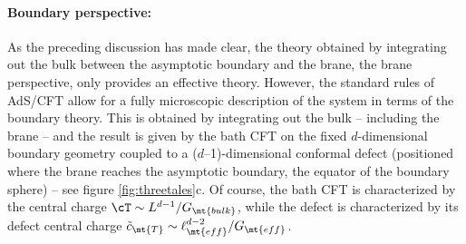 \paragraph{Boundary perspective:} As the preceding discussion has made clear, the theory obtained by integrating out the bulk between the asymptotic boundary and the brane, \ie the brane perspective, only provides an effective theory. However, the standard rules of AdS/CFT allow for a fully microscopic description of the system in terms of the boundary theory. This is obtained by integrating out the bulk -- including the brane -- and the result  is given by the bath CFT on the fixed $d$-dimensional boundary geometry coupled to a ($d$--1)-dimensional conformal defect (positioned where the brane reaches the asymptotic boundary, \ie the equator of the boundary sphere) -- see figure \ref{fig:threetales}c. Of course, the bath CFT is characterized by the central charge $\cT\sim L^{d-1}/G_\mt{bulk}$, while the defect is characterized by its defect central charge $\tilde{c}_\mt{T}\sim \ell_\mt{eff}^{d-2}/G_\mt{eff}$.

